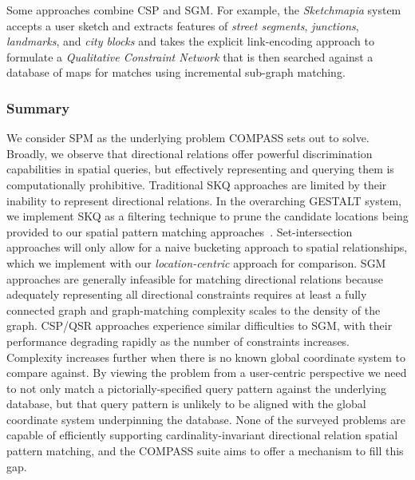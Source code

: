 \par{
        Some approaches combine CSP and SGM. For example, the \textit{Sketchmapia} system accepts a user sketch and extracts features of \textit{street segments}, \textit{junctions}, \textit{landmarks}, and \textit{city blocks} and takes the explicit link-encoding approach to formulate a \textit{Qualitative Constraint Network} that is then searched against a database of maps for matches using incremental sub-graph matching.
}    


\subsubsection{Summary}
\par{
    We consider SPM as the underlying problem COMPASS sets out to solve. 
    Broadly, we observe that directional relations offer powerful discrimination capabilities in spatial queries, but effectively representing and querying them is computationally prohibitive. 
    Traditional SKQ approaches are limited by their inability to represent directional relations. In the overarching GESTALT system, we implement SKQ as a filtering technique to prune the candidate locations being provided to our spatial pattern matching approaches~\cite{Osul2023}.
    Set-intersection approaches will only allow for a naive bucketing approach to spatial relationships, which we implement with our \textit{location-centric} approach for comparison.
    SGM approaches are generally infeasible for matching directional relations because adequately representing all directional constraints requires at least a fully connected graph and graph-matching complexity scales to the density of the graph.
    CSP/QSR approaches experience similar difficulties to SGM, with their performance degrading rapidly as the number of constraints increases.
    Complexity increases further when there is no known global coordinate system to compare against. 
    By viewing the problem from a user-centric perspective we need to not only match a pictorially-specified query pattern against the underlying database, but that query pattern is unlikely to be aligned with the global coordinate system underpinning the database. 
    None of the surveyed problems are capable of efficiently supporting cardinality-invariant directional relation spatial pattern matching, and the COMPASS suite aims to offer a mechanism to fill this gap. 
}

